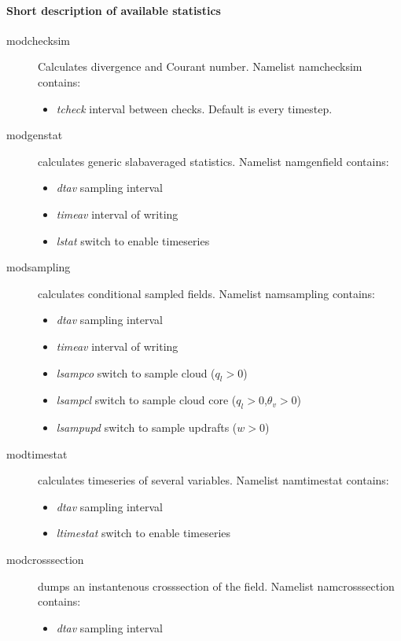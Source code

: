 \documentclass[a4paper,10pt]{article}
\begin{document}
\paragraph{Short description of available statistics}
\begin{description}
\item [modchecksim]Calculates divergence and Courant number. Namelist namchecksim contains:
\begin{itemize}
 \item \textit{tcheck}  interval between checks. Default is every timestep.
\end{itemize}
\item [modgenstat]calculates generic slabaveraged statistics. Namelist namgenfield contains:
\begin{itemize}
 \item\textit{dtav}           sampling interval
\item \textit{timeav}         interval of writing
\item \textit{lstat}      switch to enable timeseries
\end{itemize}
\item [modsampling]calculates conditional sampled fields. Namelist namsampling contains:
\begin{itemize}
 \item \textit{dtav}           sampling interval
\item \textit{timeav}         interval of writing
\item \textit{lsampco}        switch to sample cloud ($q_l>0$)
\item \textit{lsampcl}        switch to sample cloud core ($q_l>0$,$\theta_v>0$)
\item \textit{lsampupd}       switch to sample updrafts ($w>0$)
\end{itemize}
\item [modtimestat]calculates timeseries of several variables. Namelist namtimestat contains:
\begin{itemize}
 \item \textit{dtav}           sampling interval
\item \textit{ltimestat}      switch to enable timeseries
\end{itemize}
\item [modcrosssection] dumps an instantenous crosssection of the field. Namelist namcrosssection contains:
\begin{itemize}
 \item \textit{dtav}        sampling interval

\end{itemize}
\end{description}
\end{document}
